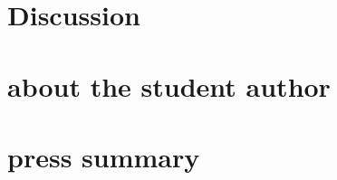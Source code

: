 \documentclass[10pt]{article}
\begin{document}
\section{Discussion}









\section*{about the student author}



\section*{press summary}
\end{document}
